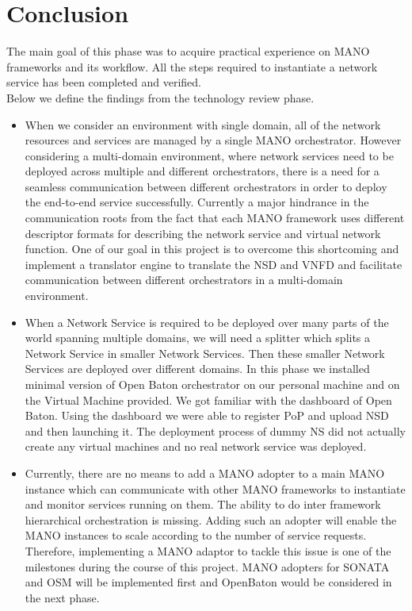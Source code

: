 \chapter{Conclusion}
\label{ch:Conclusion}

The main goal of this phase was to acquire practical experience on MANO frameworks and its workflow. All the steps required to instantiate a network service has been completed and verified.\\

Below we define the findings from the technology review phase.

\begin{itemize}
	
	\item When we consider an environment with single domain, all of the network resources and services are managed by a single MANO orchestrator. However considering a multi-domain
	environment, where network services need to be deployed across multiple and different orchestrators, there is a need for a seamless communication between different orchestrators in order to deploy the end-to-end service successfully. Currently a major hindrance in the communication roots from the fact that each MANO framework uses different descriptor formats for describing the network service and virtual network function. One of our goal in this project is to overcome this shortcoming and  implement a translator engine to translate the NSD and VNFD and facilitate communication between different orchestrators in a multi-domain environment.
	
	\item When a Network Service is required to be deployed over many parts of the world spanning multiple domains, we will need a splitter which splits a Network Service in smaller Network Services. Then these smaller Network Services are deployed over different domains. In this phase we installed minimal version of Open Baton orchestrator on our personal machine and on the Virtual Machine provided. We got familiar with the dashboard of Open Baton. Using the dashboard we were able to register PoP and upload NSD and then launching it. The deployment process of dummy NS did not actually create any virtual machines and no real network service was deployed. 
	 
	\item Currently, there are no means to add a MANO adopter to a main MANO instance which can communicate with other MANO frameworks to instantiate and monitor services running on them. The ability to do inter framework hierarchical orchestration is missing. Adding such an adopter will enable the MANO instances to scale according to the number of service requests. Therefore, implementing a MANO adaptor to tackle this issue is one of the milestones during the course of this project. MANO adopters for SONATA and OSM will be implemented first and OpenBaton would be considered in the next phase.
	 
\end{itemize}





